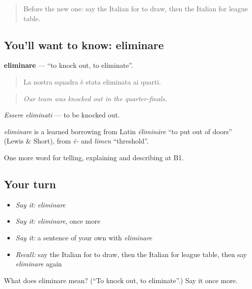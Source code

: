 \label{lesson:IT-C511-eliminare}



\begin{quote}
Before the new one: say the Italian for to draw, then the Italian for league table.
\end{quote}

\subsection*{You'll want to know: eliminare}
\textbf{eliminare} — \textquotedblleft{}to knock out, to eliminate\textquotedblright{}.

\begin{quote}
La nostra squadra è stata eliminata ai quarti.
\end{quote}

\begin{quote}
\emph{Our team was knocked out in the quarter-finals.}
\end{quote}

\emph{Essere eliminati} — to be knocked out.

\begin{cousinweb}
\emph{eliminare} is a learned borrowing from Latin \emph{ēlīmināre} \textquotedblleft{}to put out of doors\textquotedblright{} (Lewis \& Short), from \emph{ē-} and \emph{līmen} \textquotedblleft{}threshold\textquotedblright{}.
\end{cousinweb}

\begin{grammarlens}[title={What you've built}]
One more word for telling, explaining and describing at B1.
\end{grammarlens}

\subsection*{Your turn}
\begin{itemize}
\raggedright
  \item \emph{Say it:} \emph{eliminare}
  \item \emph{Say it:} \emph{eliminare}, once more
  \item \emph{Say it:} a sentence of your own with \emph{eliminare}
  \item \emph{Recall:} say the Italian for to draw, then the Italian for league table, then say \emph{eliminare} again
\end{itemize}

\begin{tcolorbox}[breakable,colback=teal!4,colframe=teal!35!black,title={Before you move on}]
What does eliminare mean? (\textquotedblleft{}To knock out, to eliminate\textquotedblright{}.) Say it once more.
\end{tcolorbox}
